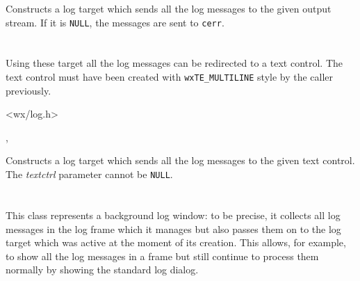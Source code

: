 


Constructs a log target which sends all the log messages to the given
output stream. If it is {\tt NULL}, the messages are sent to {\tt cerr}.


\section{}\label{wxlogtextctrl}

Using these target all the log messages can be redirected to a text control.
The text control must have been created with {\tt wxTE\_MULTILINE} style by the
caller previously.




<wx/log.h>


,\\




Constructs a log target which sends all the log messages to the given text
control. The {\it textctrl} parameter cannot be {\tt NULL}.


\section{}\label{wxlogwindow}

This class represents a background log window: to be precise, it collects all
log messages in the log frame which it manages but also passes them on to the
log target which was active at the moment of its creation. This allows, for
example, to show all the log messages in a frame but still continue to process
them normally by showing the standard log dialog.

